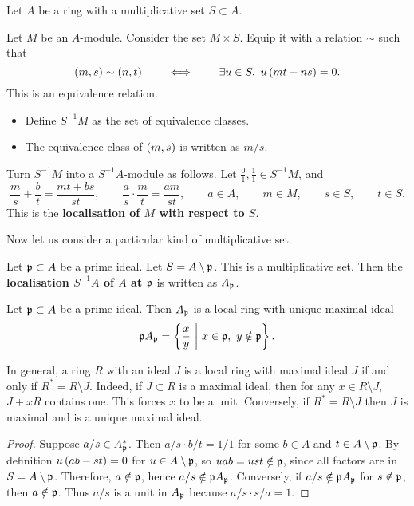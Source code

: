 Let $ A $ be a ring with a multiplicative set $ S \subset A $.

\begin{definition}
Let $ M $ be an $ A $-module. Consider the set $ M \times S $. Equip it with a relation $ \sim $ such that
$$ \br{m, s} \sim \br{n, t} \qquad \iff \qquad \exists u \in S, \ u\br{mt - ns} = 0. $$
This is an equivalence relation.
\begin{itemize}
\item Define $ S^{-1}M $ as the set of equivalence classes.
\item The equivalence class of $ \br{m, s} $ is written as $ m / s $.
\end{itemize}
Turn $ S^{-1}M $ into a $ S^{-1}A $-module as follows. Let $ \tfrac{0}{1}, \tfrac{1}{1} \in S^{-1}M $, and
$$ \dfrac{m}{s} + \dfrac{b}{t} = \dfrac{mt + bs}{st}, \qquad \dfrac{a}{s} \cdot \dfrac{m}{t} = \dfrac{am}{st}, \qquad a \in A, \qquad m \in M, \qquad s \in S, \qquad t \in S. $$
This is the \textbf{localisation of $ M $ with respect to $ S $}.
\end{definition}

Now let us consider a particular kind of multiplicative set.

\begin{definition}
Let $ \mathfrak{p} \subset A $ be a prime ideal. Let $ S = A \setminus \mathfrak{p} $. This is a multiplicative set. Then the \textbf{localisation $ S^{-1}A $ of $ A $ at $ \mathfrak{p} $} is written as $ A_{\mathfrak{p}} $.
\end{definition}

\begin{theorem}
Let $ \mathfrak{p} \subset A $ be a prime ideal. Then $ A_{\mathfrak{p}} $ is a local ring with unique maximal ideal
$$ \ppp A_\ppp = \cbr{\dfrac{x}{y} \st x \in \ppp, \ y \notin \ppp}. $$
\end{theorem}

\begin{remark*}
In general, a ring $ R $ with an ideal $ J $ is a local ring with maximal ideal $ J $ if and only if $ R^* = R \setminus J $. Indeed, if $ J \subset R $ is a maximal ideal, then for any $ x \in R \setminus J $, $ J + xR $ contains one. This forces $ x $ to be a unit. Conversely, if $ R^* = R \setminus J $ then $ J $ is maximal and is a unique maximal ideal.
\end{remark*}

\begin{proof}
Suppose $ a / s \in A_{\mathfrak{p}}^* $. Then $ a / s \cdot b / t = 1 / 1 $ for some $ b \in A $ and $ t \in A \setminus \mathfrak{p} $. By definition $ u\br{ab - st} = 0 $ for $ u \in A \setminus \mathfrak{p} $, so $ uab = ust \notin \mathfrak{p} $, since all factors are in $ S = A \setminus \mathfrak{p} $. Therefore, $ a \notin \mathfrak{p} $, hence $ a / s \notin \mathfrak{p} A_{\mathfrak{p}} $. Conversely, if $ a / s \notin \mathfrak{p} A_{\mathfrak{p}} $ for $ s \notin \mathfrak{p} $, then $ a \notin \mathfrak{p} $. Thus $ a / s $ is a unit in $ A_{\mathfrak{p}} $ because $ a / s \cdot s / a = 1 $.
\end{proof}

